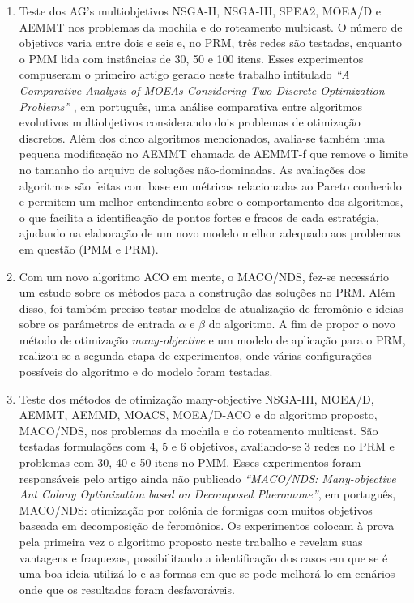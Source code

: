 \begin{enumerate}
	\item Teste dos AG's multiobjetivos NSGA-II, NSGA-III, SPEA2, MOEA/D e AEMMT nos problemas da mochila e do roteamento multicast. O número de objetivos varia entre dois e seis e, no PRM, três redes são testadas, enquanto o PMM lida com instâncias de 30, 50 e 100 itens. Esses experimentos compuseram o primeiro artigo gerado neste trabalho intitulado \textit{``A Comparative Analysis of MOEAs Considering Two Discrete Optimization Problems''} \cite{Franca2017}, em português, uma análise comparativa entre algoritmos evolutivos multiobjetivos considerando dois problemas de otimização discretos. Além dos cinco algoritmos mencionados, avalia-se também uma pequena modificação no AEMMT chamada de AEMMT-f que remove o limite no tamanho do arquivo de soluções não-dominadas. As avaliações dos algoritmos são feitas com base em métricas relacionadas ao Pareto conhecido e permitem um melhor entendimento sobre o comportamento dos algoritmos, o que facilita a identificação de pontos fortes e fracos de cada estratégia, ajudando na elaboração de um novo modelo melhor adequado aos problemas em questão (PMM e PRM).
	\item Com um novo algoritmo ACO em mente, o MACO/NDS, fez-se necessário um estudo sobre os métodos para a construção das soluções no PRM. Além disso, foi também preciso testar modelos de atualização de feromônio e ideias sobre os parâmetros de entrada $\alpha$ e $\beta$ do algoritmo. A fim de propor o novo método de otimização \textit{many-objective} e um modelo de aplicação para o PRM, realizou-se a segunda etapa de experimentos, onde várias configurações possíveis do algoritmo e do modelo foram testadas.
	\item Teste dos métodos de otimização many-objective NSGA-III, MOEA/D, AEMMT, AEMMD, MOACS, MOEA/D-ACO e do algoritmo proposto, MACO/NDS, nos problemas da mochila e do roteamento multicast. São testadas formulações com 4, 5 e 6 objetivos, avaliando-se 3 redes no PRM e problemas com 30, 40 e 50 itens no PMM. Esses experimentos foram responsáveis pelo artigo ainda não publicado \textit{``MACO/NDS: Many-objective Ant Colony Optimization based on Decomposed Pheromone''}, em português, MACO/NDS: otimização por colônia de formigas com muitos objetivos baseada em decomposição de feromônios. Os experimentos colocam à prova pela primeira vez o algoritmo proposto neste trabalho e revelam suas vantagens e fraquezas, possibilitando a identificação dos casos em que se é uma boa ideia utilizá-lo e as formas em que se pode melhorá-lo em cenários onde que os resultados foram desfavoráveis.

\end{enumerate}
